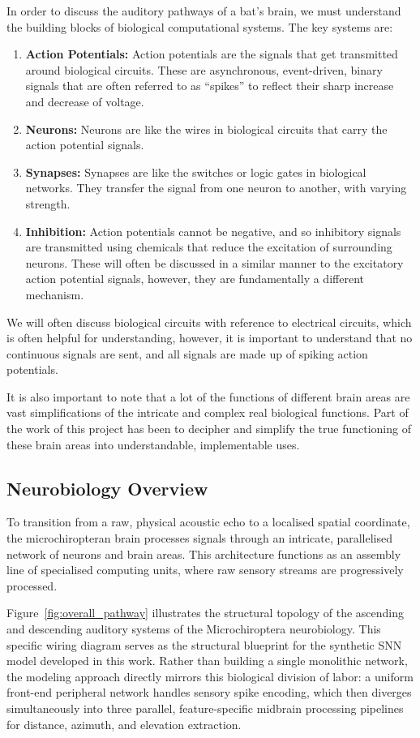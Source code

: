 In order to discuss the auditory pathways of a bat's brain, we must understand the building blocks of biological computational systems. The key systems are:
\begin{enumerate}
    \item \textbf{Action Potentials:} Action potentials are the signals that get transmitted around biological circuits. These are asynchronous, event-driven, binary signals that are often referred to as ``spikes'' to reflect their sharp increase and decrease of voltage.
    \item \textbf{Neurons:} Neurons are like the wires in biological circuits that carry the action potential signals.
    \item \textbf{Synapses:} Synapses are like the switches or logic gates in biological networks. They transfer the signal from one neuron to another, with varying strength.
    \item \textbf{Inhibition:} Action potentials cannot be negative, and so inhibitory signals are transmitted using chemicals that reduce the excitation of surrounding neurons. These will often be discussed in a similar manner to the excitatory action potential signals, however, they are fundamentally a different mechanism.
\end{enumerate}
We will often discuss biological circuits with reference to electrical circuits, which is often helpful for understanding, however, it is important to understand that no continuous signals are sent, and all signals are made up of spiking action potentials.

It is also important to note that a lot of the functions of different brain areas are vast simplifications of the intricate and complex real biological functions. Part of the work of this project has been to decipher and simplify the true functioning of these brain areas into understandable, implementable uses.


\subsection{Neurobiology Overview}
To transition from a raw, physical acoustic echo to a localised spatial coordinate, the microchiropteran brain processes signals through an intricate, parallelised network of neurons and brain areas. This architecture functions as an assembly line of specialised computing units, where raw sensory streams are progressively processed.

Figure~\ref{fig:overall_pathway} illustrates the structural topology of the ascending and descending auditory systems of the Microchiroptera neurobiology. This specific wiring diagram serves as the structural blueprint for the synthetic SNN model developed in this work. Rather than building a single monolithic network, the modeling approach directly mirrors this biological division of labor: a uniform front-end peripheral network handles sensory spike encoding, which then diverges simultaneously into three parallel, feature-specific midbrain processing pipelines for distance, azimuth, and elevation extraction. 


